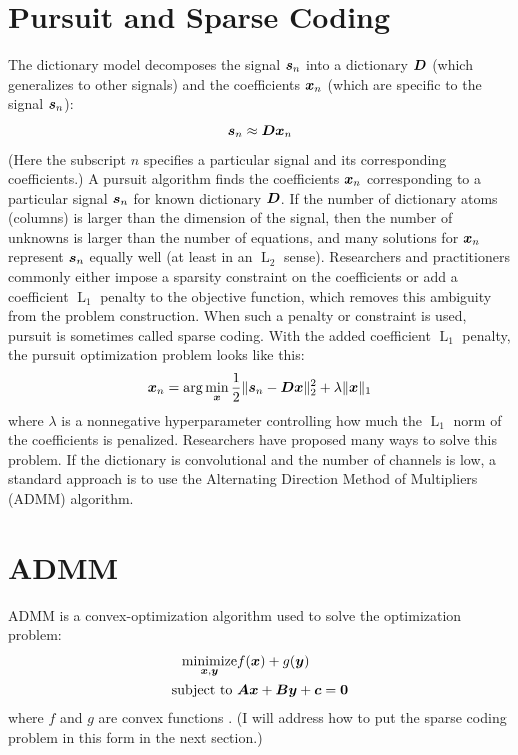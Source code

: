 \section{Pursuit and Sparse Coding}
\label{section:sparse coding}
The dictionary model decomposes the signal $\bm{s}_n$ into a dictionary $\bm{D}$ (which generalizes to other signals) and the coefficients $\bm{x}_n$ (which are specific to the signal $\bm{s}_n$):
%
\begin{equation}
\bm{s}_n \approx \bm{D}\bm{x}_n
\end{equation}
%
(Here the subscript $n$ specifies a particular signal and its corresponding coefficients.) A pursuit algorithm finds the coefficients $\bm{x}_n$ corresponding to a particular signal $\bm{s}_n$ for known dictionary $\bm{D}$. If the number of dictionary atoms (columns) is larger than the dimension of the signal, then the number of unknowns is larger than the number of equations, and many solutions for $\bm{x}_n$ represent $\bm{s}_n$ equally well (at least in an $\operatorname{L}_2$ sense). Researchers and practitioners commonly either impose a sparsity constraint on the coefficients or add a coefficient $\operatorname{L}_1$ penalty to the objective function, which removes this ambiguity from the problem construction. When such a penalty or constraint is used, pursuit is sometimes called sparse coding. With the added coefficient $\operatorname{L}_1$ penalty, the pursuit optimization problem looks like this:
%
\begin{equation}\label{equation:sparse coding}
\bm{x}_n = \arg\min_{\bm{x}} \frac{1}{2}\|\bm{s}_n - \bm{D}\bm{x}\|_2^2 + \lambda \|\bm{x}\|_1
\end{equation}
%
where $\lambda$ is a nonnegative hyperparameter controlling how much the $\operatorname{L}_1$ norm of the coefficients is penalized. Researchers have proposed many ways to solve this problem. If the dictionary is convolutional and the number of channels is low, a standard approach is to use the Alternating Direction Method of Multipliers (ADMM) algorithm.

\section{ADMM}
\label{section:ADMM}
ADMM is a convex-optimization algorithm used to solve the optimization problem:
\begin{equation} \label{equation:ADMM}
\begin{aligned}
\operatorname*{\text{minimize}}_{\bm{x},\bm{y}} & f(\bm{x}) + g(\bm{y}) \\
\text{subject to } & \bm{A}\bm{x} + \bm{B}\bm{y} + \bm{c} = \bm{0} 
\end{aligned}
\end{equation}
%
where $f$ and $g$ are convex functions \cite{boyd2011distributed}. (I will address how to put the sparse coding problem in this form in the next section.)


